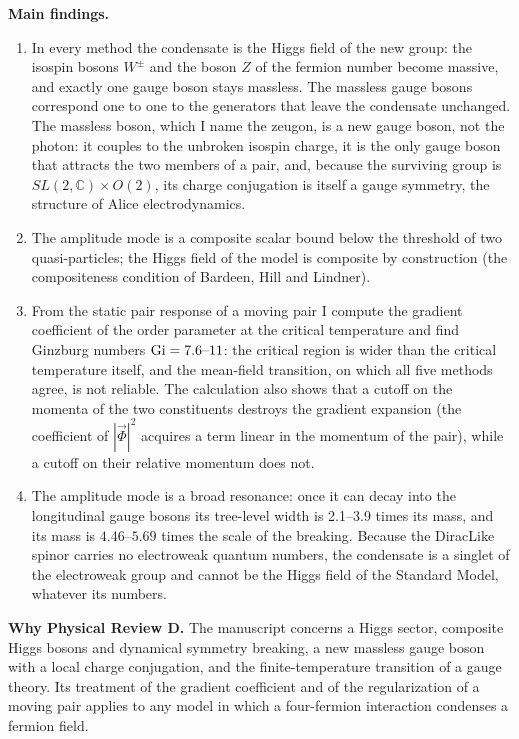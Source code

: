 \documentclass[11pt]{article}
\begin{document}
\textbf{Main findings.}
\begin{enumerate}
\item In every method the condensate is the Higgs field of the new group: the isospin bosons $W^\pm$ and the boson $Z$ of
the fermion number become massive, and exactly one gauge boson stays massless. The massless gauge bosons correspond one to
one to the generators that leave the condensate unchanged. The massless boson, which I name the zeugon, is a new gauge
boson, not the photon: it couples to the unbroken isospin charge, it is the only gauge boson that attracts the two members
of a pair, and, because the surviving group is $SL(2,\mathbb C)\times O(2)$, its charge conjugation is itself a gauge
symmetry, the structure of Alice electrodynamics.
\item The amplitude mode is a composite scalar bound below the threshold of two quasi-particles; the Higgs field of the
model is composite by construction (the compositeness condition of Bardeen, Hill and Lindner).
\item From the static pair response of a moving pair I compute the gradient coefficient of the order parameter at the
critical temperature and find Ginzburg numbers ${\rm Gi}=7.6\mbox{--}11$: the critical region is wider than the critical
temperature itself, and the mean-field transition, on which all five methods agree, is not reliable. The calculation also
shows that a cutoff on the momenta of the two constituents destroys the gradient expansion (the coefficient of
$|\vec\Phi|^2$ acquires a term linear in the momentum of the pair), while a cutoff on their relative momentum does not.
\item The amplitude mode is a broad resonance: once it can decay into the longitudinal gauge bosons its tree-level width is
2.1\mbox{--}3.9 times its mass, and its mass is $4.46\mbox{--}5.69$ times the scale of the breaking. Because the DiracLike spinor
carries no electroweak quantum numbers, the condensate is a singlet of the electroweak group and cannot be the Higgs field
of the Standard Model, whatever its numbers.
\end{enumerate}

\textbf{Why Physical Review D.} The manuscript concerns a Higgs sector, composite Higgs bosons and dynamical symmetry
breaking, a new massless gauge boson with a local charge conjugation, and the finite-temperature transition of a gauge
theory. Its treatment of the gradient coefficient and of the regularization of a moving pair applies to any
model in which a four-fermion interaction condenses a fermion field.
\end{document}
